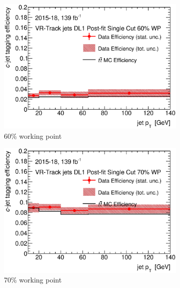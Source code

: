 \documentclass[letterpaper,12pt]{article}
\begin{document}
\newpage
\begin{figure}[H]
	\centering
	\begin{subfigure}[t]{.35\linewidth}
		\includegraphics[width=1\textwidth]{FTAG_plots/DL1allVRJetsDec/eff60.eps}
		\caption{60\% working point}
			\end{subfigure}
		\begin{subfigure}[t]{.35\linewidth}
			\includegraphics[width=1\textwidth]{FTAG_plots/DL1allVRJetsDec/eff70.eps}
			\caption{70\% working point}
		\end{subfigure}
		\begin{subfigure}[t]{.35\linewidth}

\end{subfigure}
\end{figure}
\end{document}

